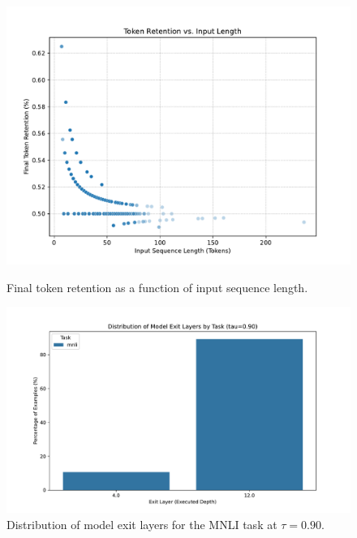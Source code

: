 \documentclass[11pt,letterpaper]{article}
\theoremstyle{plain}
\begin{document}
\begin{figure}[h!]
  \centering
  \begin{minipage}{0.48\textwidth}
    \centering
    \includegraphics[width=\linewidth]{results/plots/retention_vs_length.pdf}
    \caption{Final token retention as a function of input sequence length.}
    \label{fig:retention-plot}
  \end{minipage}\hfill
  \begin{minipage}{0.48\textwidth}
    \centering
    \includegraphics[width=\linewidth]{results/plots/exit_distribution.pdf}
    \caption{Distribution of model exit layers for the MNLI task at $\tau=0.90$.}
    \label{fig:exit-plot}
  \end{minipage}
\end{figure}
\end{document}
